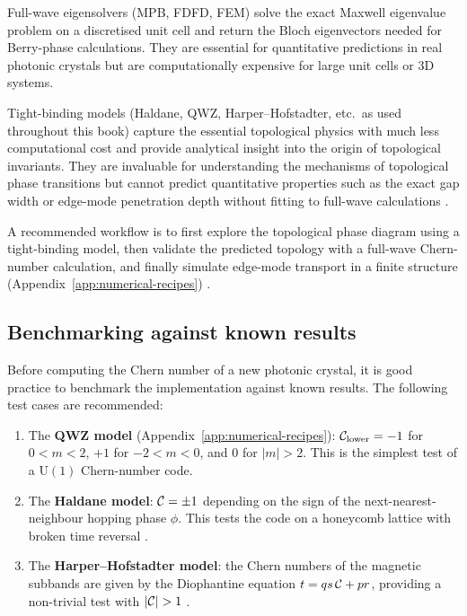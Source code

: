 Full-wave eigensolvers (MPB, FDFD, FEM) solve the exact Maxwell
eigenvalue problem on a discretised unit cell and return the Bloch
eigenvectors needed for Berry-phase calculations.  They are essential
for quantitative predictions in real photonic crystals but are
computationally expensive for large unit cells or 3D systems.

Tight-binding models (Haldane, QWZ, Harper--Hofstadter, etc.\
as used throughout this book) capture the essential topological
physics with much less computational cost and provide analytical
insight into the origin of topological invariants.  They are
invaluable for understanding the mechanisms of topological phase
transitions but cannot predict quantitative properties such as the
exact gap width or edge-mode penetration depth without fitting to
full-wave calculations \cite{ozawa2018topological,zhao2020first}.

A recommended workflow is to first explore the topological phase
diagram using a tight-binding model, then validate the predicted
topology with a full-wave Chern-number calculation, and finally
simulate edge-mode transport in a finite structure
(Appendix~\ref{app:numerical-recipes})
\cite{paz2019tutorial,chen2023berry}.

\subsection{Benchmarking against known results}
\label{sec:ch10-benchmarking}

Before computing the Chern number of a new photonic crystal, it is
good practice to benchmark the implementation against known results.
The following test cases are recommended:

\begin{enumerate}
  \item The \textbf{QWZ model} (Appendix~\ref{app:numerical-recipes}):
    $\mathcal{C}_{\mathrm{lower}}=-1$ for $0<m<2$, $+1$ for $-2<m<0$,
    and $0$ for $|m|>2$.  This is the simplest test of a
    $\mathrm{U}(1)$ Chern-number code.
  \item The \textbf{Haldane model}: $\mathcal{C}=\pm 1$ depending on the
    sign of the next-nearest-neighbour hopping phase $\phi$.
    This tests the code on a honeycomb lattice with
    broken time reversal \cite{haldane2008possible}.
  \item The \textbf{Harper--Hofstadter model}: the Chern numbers of
    the magnetic subbands are given by the Diophantine equation
    $t=qs\,\mathcal{C}+pr$, providing a non-trivial test with
    $|\Chern|>1$ \cite{asbth2016berry,thouless1982quantized}.
\end{enumerate}

